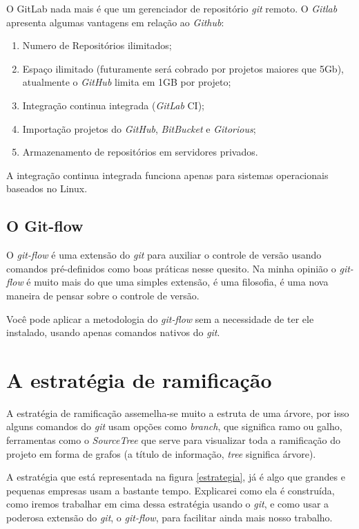 \documentclass[12pt,openright,oneside,a4paper,english,brazil]{abntex2}
\begin{document}
O GitLab nada mais é que um gerenciador de repositório \textit{git} remoto. O \textit{Gitlab} apresenta algumas vantagens em relação ao \textit{Github}:

\begin{enumerate}
	\item Numero de Repositórios ilimitados;
	\item Espaço ilimitado (futuramente será cobrado por projetos maiores que 5Gb), atualmente o \textit{GitHub} limita em 1GB por projeto;
	\item Integração continua integrada (\textit{GitLab} CI);
	\item Importação projetos do \textit{GitHub}, \textit{BitBucket} e \textit{Gitorious};
	\item Armazenamento de repositórios em servidores privados.
\end{enumerate}

A integração continua integrada funciona apenas para sistemas operacionais baseados no Linux.

\section{O Git-flow}
O \textit{git-flow}  é uma extensão do \textit{git} para auxiliar o controle de versão usando comandos pré-definidos como boas práticas nesse quesito. Na minha opinião o \textit{git-flow}  é muito mais do que uma simples extensão, é uma filosofia, é uma nova maneira de pensar sobre o controle de versão. 

Você pode aplicar a metodologia do \textit{git-flow}  sem a necessidade de ter ele instalado, usando apenas comandos nativos do \textit{git}. 

\chapter{A estratégia de ramificação}
A estratégia de ramificação assemelha-se muito a estruta de uma árvore, por isso alguns comandos do \textit{git} usam opções como \textit{branch}, que significa ramo ou galho, ferramentas como o \textit{SourceTree} que serve para visualizar toda a ramificação do projeto em forma de grafos (a título de informação, \textit{tree} significa árvore).

A estratégia que está representada na figura \ref{estrategia}, já é algo que grandes e pequenas empresas usam a bastante tempo. Explicarei como ela é construída, como iremos trabalhar em cima dessa estratégia usando o \textit{git}, e como usar a poderosa extensão do \textit{git}, o \textit{\textit{git-flow}}, para facilitar ainda mais nosso trabalho. 
\end{document}
